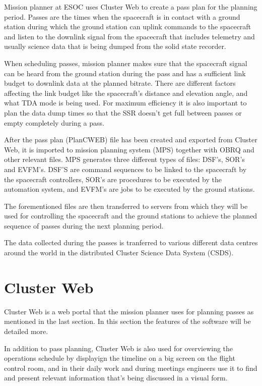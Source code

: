 Mission planner at ESOC uses Cluster Web to create a pass plan for the planning period. Passes are the times when the spacecraft is in contact with a ground station during which the ground station can uplink commands to the spacecraft and listen to the downlink signal from the spacecraft that includes telemetry and usually science data that is being dumped from the solid state recorder.

When scheduling passes, mission planner makes sure that the spacecraft signal can be heard from the ground station during the pass and has a sufficient link budget to downlink data at the planned bitrate. There are different factors affecting the link budget like the spacecraft's distance and elevation angle, and what TDA mode is being used. For maximum efficiency it is also important to plan the data dump times so that the SSR doesn't get full between passes or empty completely during a pass.

After the pass plan (PlanCWEB) file has been created and exported from Cluster Web, it is imported to mission planning system (MPS) together with OBRQ and other relevant files. MPS generates three different types of files: DSF's, SOR's and EVFM's. DSF'S are command sequences to be linked to the spacecraft  by the spacecraft controllers, SOR's are procedures to be executed by the automation system, and EVFM's are jobs to be executed by the ground stations.

The forementioned files are then transferred to servers from which they will be used for controlling the spacecraft and the ground stations to achieve the planned sequence of passes during the next planning period.

The data collected during the passes is tranferred to various different data centres around the world in the distributed Cluster Science Data System (CSDS).

\cite{esasci, esacluster}

\section{Cluster Web}\label{clusterweb_section}
Cluster Web is a web portal that the mission planner uses for planning passes as mentioned in the last section. In this section the features of the software will be detailed more.

In addition to pass planning, Cluster Web is also used for overviewing the operations schedule by displayign the timeline on a big screen on the flight control room, and in their daily work and during meetings engineers use it to find and present relevant information that's being discussed in a visual form.

